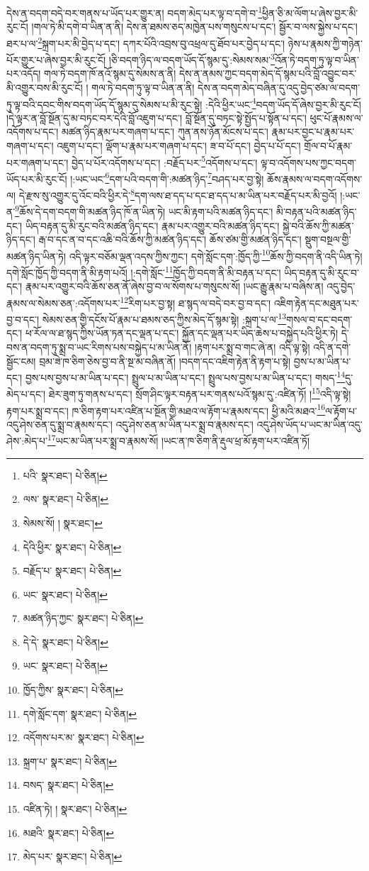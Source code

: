དེས་ན་བདག་བདེ་བར་གནས་པ་ཡོད་པར་གྱུར་ན། བདག་མེད་པར་ལྟ་བ་དགེ་བ་\footnote{པའི་  སྣར་ཐང་།  པེ་ཅིན། }ཕྱིན་ཅི་མ་ལོག་པ་ཞེས་བྱར་མི་རུང་ངོ། །གལ་ཏེ་མི་དགེ་བ་ཡིན་ན་ནི། དེས་ན་ཐམས་ཅད་མཁྱེན་པས་གསུངས་པ་དང་། སྦྱོར་བ་ལས་སྐྱེས་པ་དང་། ཐར་པ་ལ་\footnote{ལས་  སྣར་ཐང་།  པེ་ཅིན། }སྐྲག་པར་མི་བྱེད་པ་དང་། དཀར་པོའི་འབྲས་བུ་འཕྲལ་དུ་ཐོབ་པར་བྱེད་པ་དང་། ཉེས་པ་རྣམས་ཀྱི་གཉེན་པོར་གྱུར་པ་ཞེས་བྱར་མི་རུང་ངོ། །ཅི་བདག་ཉིད་ལ་བདག་ཡོད་དོ་སྙམ་དུ་:སེམས་སམ་\footnote{སེམས་སོ། །  སྣར་ཐང་། }འོན་ཏེ་བདག་ཏུ་ལྟ་བ་ཡིན་པར་འདོད། གལ་ཏེ་བདག་ཁོ་ནའོ་སྙམ་དུ་སེམས་ན་ནི། དེས་ན་ནམས་ཀྱང་བདག་མེད་དོ་སྙམ་པའི་བློ་འབྱུང་བར་མི་འགྱུར་བས་མི་རུང་ངོ། །
གལ་ཏེ་བདག་ཏུ་ལྟ་བ་ཡིན་ན་ནི། དེས་ན་བདག་མེད་བཞིན་དུ་འདུ་བྱེད་ཙམ་ལ་བདག་ཏུ་ལྟ་བའི་དབང་གིས་བདག་ཡོད་དོ་སྙམ་དུ་སེམས་པ་མི་རུང་སྟེ། :དེའི་ཕྱིར་ཡང་\footnote{དེའི་ཕྱིར་  སྣར་ཐང་།  པེ་ཅིན། }བདག་ཡོད་དོ་ཞེས་བྱར་མི་རུང་ངོ། །དེ་ལྟར་ན་བློ་སྔོན་དུ་མ་བཏང་བར་དེའི་བློ་འཇུག་པ་དང་། བློ་སྔོན་དུ་བཏང་སྟེ་སྤྱོད་པ་སྟོན་པ་དང་། ཕུང་པོ་རྣམས་ལ་འདོགས་པ་དང་། མཚན་ཉིད་རྣམ་པར་གཞག་པ་དང་། ཀུན་ནས་ཉོན་མོངས་པ་དང་། རྣམ་པར་བྱང་པ་རྣམ་པར་གཞག་པ་དང་། འཇུག་པ་དང་། ལྡོག་པ་རྣམ་པར་གཞག་པ་དང་། ཟ་བ་པོ་དང་། བྱེད་པ་པོ་དང་། གྲོལ་བ་པོ་རྣམ་པར་གཞག་པ་དང་། བྱེད་པ་པོར་འདོགས་པ་དང་། :བརྗོད་པར་\footnote{བརྗོད་པ་  སྣར་ཐང་།  པེ་ཅིན། }འདོགས་པ་དང་། ལྟ་བ་འདོགས་པས་ཀྱང་བདག་ཡོད་པར་མི་རུང་ངོ། །:ཡང་ཡང་\footnote{ཡང་  སྣར་ཐང་།  པེ་ཅིན། }དག་པའི་བདག་གི་:མཚན་ཉིད་\footnote{མཚན་ཉིད་ཀྱང་  སྣར་ཐང་།  པེ་ཅིན། }བཤད་པར་བྱ་སྟེ། ཆོས་རྣམས་ལ་བདག་འདོགས་ལ། དེ་རྫས་སུ་འགྱུར་དུ་འོང་བའི་ཕྱིར་དེ་\footnote{དེ་དེ་  སྣར་ཐང་།  པེ་ཅིན། }དག་ལས་ཐ་དད་པ་དང་ཐ་དད་པ་མ་ཡིན་པར་བརྗོད་པར་མི་བྱའོ། །:ཡང་ན་\footnote{ཡང་  སྣར་ཐང་།  པེ་ཅིན། }ཆོས་དེ་དག་བདག་གི་མཚན་ཉིད་ཁོ་ན་ཡིན་ཏེ། ཡང་མི་རྟག་པའི་མཚན་ཉིད་དང་། མི་བརྟན་པའི་མཚན་ཉིད་དང་། ཡིད་བརྟན་དུ་མི་རུང་བའི་མཚན་ཉིད་དང་། རྣམ་པར་འགྱུར་བའི་མཚན་ཉིད་དང་། སྐྱེ་བའི་ཆོས་ཀྱི་མཚན་ཉིད་དང་། རྒ་བ་དང་ན་བ་དང་འཆི་བའི་ཆོས་ཀྱི་མཚན་ཉིད་དང་། ཆོས་ཙམ་གྱི་མཚན་ཉིད་དང་། སྡུག་བསྔལ་གྱི་མཚན་ཉིད་ཡིན་ཏེ། འདི་ལྟར་བཅོམ་ལྡན་འདས་ཀྱིས་ཀྱང་། དགེ་སློང་དག་:ཁྱོད་ཀྱི་\footnote{ཁྱོད་ཀྱིས་  སྣར་ཐང་།  པེ་ཅིན། }ཆོས་ཀྱི་བདག་ནི་འདི་ཡིན་ཏེ། དགེ་སློང་ཁྱོད་ཀྱི་བདག་ནི་མི་རྟག་པའོ། །:དགེ་སློང་\footnote{དགེ་སློང་དག་  སྣར་ཐང་།  པེ་ཅིན། }ཁྱོད་ཀྱི་བདག་ནི་མི་བརྟན་པ་དང་། ཡིད་བརྟན་དུ་མི་རུང་བ་དང་། རྣམ་པར་འགྱུར་བའི་ཆོས་ཅན་ནོ་ཞེས་བྱ་བ་ལ་སོགས་པ་གསུངས་སོ། །ཡང་རྒྱུ་རྣམ་པ་བཞིས་ན། འདུ་བྱེད་རྣམས་ལ་སེམས་ཅན་:འདོགས་པར་\footnote{འདོགས་པར་མ་  སྣར་ཐང་།  པེ་ཅིན། }རིག་པར་བྱ་སྟ། ཐ་སྙད་ལ་བདེ་བར་བྱ་བ་དང་། འཇིག་རྟེན་དང་མཐུན་པར་བྱ་བ་དང་། སེམས་ཅན་གྱི་དངོས་པོ་རྣམ་པ་ཐམས་ཅད་ཀྱིས་མེད་དོ་སྙམ་སྟེ། :སྐྲག་པ་ལ་\footnote{སྐྲག་པ་  སྣར་ཐང་།  པེ་ཅིན། }གསལ་བ་དང་བདག་དང་། ཕ་རོལ་ལ་ཐ་སྙད་ཀྱིས་ཡོན་ཏན་དང་ལྡན་པ་དང་། སྐྱོན་དང་ལྡན་པར་ཡིད་ཆེས་པ་བསྐྱེད་པའི་ཕྱིར་ཏེ། དེ་བས་ན་བདག་ཏུ་སྨྲ་བ་ཡང་རིགས་པས་བསྐྱེད་པ་མ་ཡིན་ནོ། །རྟག་པར་སྨྲ་བ་གང་ཞེ་ན། འདི་ལྟ་སྟེ། འདི་ན་དགེ་སྦྱོང་ངམ། བྲམ་ཟེ་ཁ་ཅིག་ཅེས་བྱ་བ་ནི་སྔ་མ་བཞིན་ནོ། །བདག་དང་འཇིག་རྟེན་ནི་རྟག་པ་སྟེ། བྱས་པ་མ་ཡིན་པ་དང་། བྱས་པས་བྱས་པ་མ་ཡིན་པ་དང་། སྤྲུལ་པ་མ་ཡིན་པ་དང་། སྤྲུལ་པས་བྱས་པ་མ་ཡིན་པ་དང་། གསད་\footnote{བསད་  སྣར་ཐང་།  པེ་ཅིན། }དུ་མེད་པ་དང་། ཐེར་ཟུག་ཏུ་གནས་པ་དང་། སྲོག་ཤིང་ལྟར་བརྟན་པར་གནས་པའོ་སྙམ་དུ་:འཛིན་ཏོ། །\footnote{འཛིན་ཏེ། །  སྣར་ཐང་།  པེ་ཅིན། }འདི་ལྟ་སྟེ། རྟག་པར་སྨྲ་བ་དང་། ཁ་ཅིག་རྟག་པར་འཛིན་པ་སྔོན་གྱི་མཐའ་ལ་རྟོག་པ་རྣམས་དང་། ཕྱི་མའི་མཐའ་\footnote{མཐའི་  སྣར་ཐང་།  པེ་ཅིན། }ལ་རྟོག་པ་འདུ་ཤེས་ཅན་དུ་སྨྲ་བ་རྣམས་དང་། འདུ་ཤེས་ཅན་མ་ཡིན་པར་སྨྲ་བ་རྣམས་དང་། འདུ་ཤེས་ཡོད་པ་ཡང་མ་ཡིན་འདུ་ཤེས་:མེད་པ་\footnote{མེད་པར་  སྣར་ཐང་།  པེ་ཅིན། }ཡང་མ་ཡིན་པར་སྨྲ་བ་རྣམས་སོ། །ཡང་ན་ཁ་ཅིག་ནི་རྡུལ་ཕྲ་མོ་རྟག་པར་འཛིན་ཏོ། 